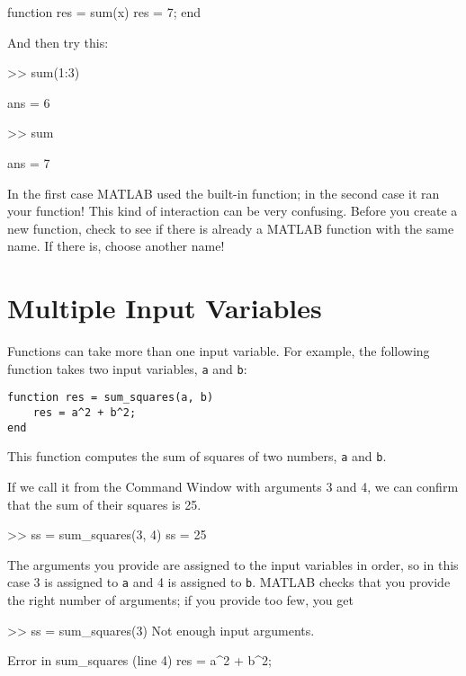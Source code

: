 
\begin{code}
function res = sum(x)
   res = 7;
end
\end{code}

And then try this:

\begin{code}
>> sum(1:3)

ans = 6

>> sum

ans = 7
\end{code}

In the first case MATLAB used the built-in function; in the second
case it ran your function!  This kind of interaction can be very
confusing.  Before you create a new function, check to see if there is
already a MATLAB function with the same name.  If there is, choose
another name!

\section{Multiple Input Variables}
\label{hypotenuse}


Functions can take more than one input variable.
For example, the following function takes two input variables,
{\tt a} and {\tt b}:

\begin{lstlisting}[caption={A function that the sum of squares of two numbers.}, label={lst:hyp_function}]
function res = sum_squares(a, b)
    res = a^2 + b^2;
end
\end{lstlisting}
  
This function computes the sum of squares of two numbers, {\tt a}
and {\tt b}.

If we call it from the Command Window with arguments 3 and 4, we can
confirm that the sum of their squares is 25.

\begin{code}
>> ss = sum_squares(3, 4)
ss = 25
\end{code}

The arguments you provide are assigned to the input variables in
order, so in this case 3 is assigned to {\tt a} and 4 is assigned to
{\tt b}.  MATLAB checks that you provide the right number of arguments;
if you provide too few, you get

\begin{code}
>> ss = sum_squares(3)
Not enough input arguments.

Error in sum_squares (line 4)
    res = a^2 + b^2;
\end{code}

